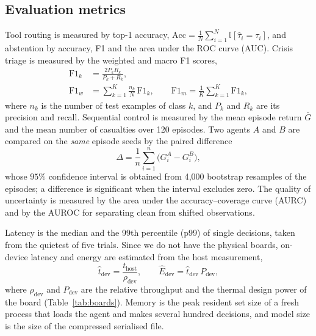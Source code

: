 \documentclass[journal]{IEEEtran}
\begin{document}
\subsection{Evaluation metrics}\label{sec:metrics}
Tool routing is measured by top-1 accuracy,
$\mathrm{Acc}=\frac{1}{N}\sum_{i=1}^{N}\mathbb{I}[\hat{\tau}_i=\tau_i]$, and
abstention by accuracy, F1 and the area under the ROC curve (AUC). Crisis triage
is measured by the weighted and macro F1 scores,
\begin{equation}
\begin{aligned}
\mathrm{F1}_k&=\frac{2P_kR_k}{P_k+R_k},\\
\mathrm{F1}_{w}&=\sum_{k=1}^{K}\frac{n_k}{N}\,\mathrm{F1}_k,\qquad
\mathrm{F1}_{m}=\frac{1}{K}\sum_{k=1}^{K}\mathrm{F1}_k,
\end{aligned}
\label{eq:f1}
\end{equation}
where $n_k$ is the number of test examples of class $k$, and $P_k$ and $R_k$ are
its precision and recall. Sequential control is measured by the mean episode
return $\bar{G}$ and the mean number of casualties over 120 episodes. Two agents
$A$ and $B$ are compared on the \emph{same} episode seeds by the paired
difference
\begin{equation}
\Delta=\frac{1}{n}\sum_{i=1}^{n}\big(G_i^{A}-G_i^{B}\big),
\label{eq:paired}
\end{equation}
whose $95\%$ confidence interval is obtained from 4{,}000 bootstrap resamples
of the episodes; a difference is significant when the interval excludes zero.
The quality of uncertainty is measured by the area under the accuracy--coverage
curve (AURC) and by the AUROC for separating clean from shifted observations.

Latency is the median and the 99th percentile (p99) of single decisions, taken
from the quietest of five trials. Since we do not have the physical boards,
on-device latency and energy are estimated from the host measurement,
\begin{equation}
\hat{t}_{\mathrm{dev}}=\frac{t_{\mathrm{host}}}{\rho_{\mathrm{dev}}},\qquad
\hat{E}_{\mathrm{dev}}=\hat{t}_{\mathrm{dev}}\,P_{\mathrm{dev}},
\label{eq:estimate}
\end{equation}
where $\rho_{\mathrm{dev}}$ and $P_{\mathrm{dev}}$ are the relative throughput and
the thermal design power of the board (Table~\ref{tab:boards}). Memory is the
peak resident set size of a fresh process that loads the agent and makes
several hundred decisions, and model size is the size of the compressed
serialised file.
\end{document}
